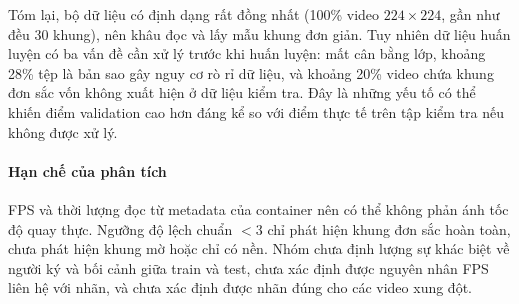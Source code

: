 Tóm lại, bộ dữ liệu có định dạng rất đồng nhất (100\% video $224\times224$, gần như đều 30 khung), nên khâu đọc và lấy mẫu khung đơn giản. Tuy nhiên dữ liệu huấn luyện có ba vấn đề cần xử lý trước khi huấn luyện: mất cân bằng lớp, khoảng 28\% tệp là bản sao gây nguy cơ rò rỉ dữ liệu, và khoảng 20\% video chứa khung đơn sắc vốn không xuất hiện ở dữ liệu kiểm tra. Đây là những yếu tố có thể khiến điểm validation cao hơn đáng kể so với điểm thực tế trên tập kiểm tra nếu không được xử lý.

\paragraph{Hạn chế của phân tích} FPS và thời lượng đọc từ metadata của container nên có thể không phản ánh tốc độ quay thực. Ngưỡng độ lệch chuẩn $<3$ chỉ phát hiện khung đơn sắc hoàn toàn, chưa phát hiện khung mờ hoặc chỉ có nền. Nhóm chưa định lượng sự khác biệt về người ký và bối cảnh giữa train và test, chưa xác định được nguyên nhân FPS liên hệ với nhãn, và chưa xác định được nhãn đúng cho các video xung đột.
